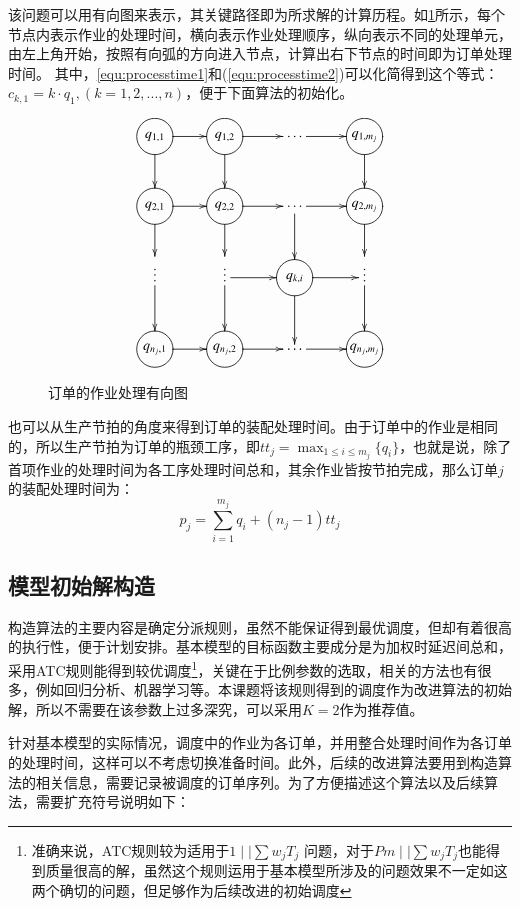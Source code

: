 该问题可以用有向图来表示，其关键路径即为所求解的计算历程。如\ref{fig:directedgraph}所示，每个节点内表示作业的处理时间，横向表示作业处理顺序，纵向表示不同的处理单元，由左上角开始，按照有向弧的方向进入节点，计算出右下节点的时间即为订单处理时间。
其中，\eqref{equ:processtime1}和(\ref{equ:processtime2})可以化简得到这个等式：$c_{k,1} = k\cdot q_1,(k = 1,2,...,n)$，便于下面算法的初始化。
\begin{figure}[h]
\begin{equation*}
\xymatrix{
\process{q_{1,1}} \ar[r] \ar[d] & \process{q_{1,2}} \ar[d] \ar[r] & \cdots\ar[r] & \process{q_{1,m_j}} \ar[d]\\
\process{q_{2,1}} \ar[r]\ar[d] & \process{q_{2,2}} \ar[d]\ar[r] & \cdots \ar[r] \ar[d]& \process{q_{2,m_j}} \ar[d] \\
\vdots\ar[d] & \vdots \ar[d]\ar[r] & \process{q_{k,i}}\ar[r]\ar[d] &\vdots \ar[d]\\
\process{q_{n_j,1}} \ar[r] & \process{q_{n_j,2}} \ar[r] & \cdots\ar[r] & \process{q_{n_j,m_j}}
}
\end{equation*}
\caption{订单的作业处理有向图\label{fig:directedgraph}}
\end{figure}

也可以从生产节拍的角度来得到订单的装配处理时间。由于订单中的作业是相同的，所以生产节拍为订单的瓶颈工序，即$\displaystyle tt_j = \max_{1\le i\le m_j}\{q_i\}$，也就是说，除了首项作业的处理时间为各工序处理时间总和，其余作业皆按节拍完成，那么订单$j$的装配处理时间为：
\begin{equation}
p_j = \sum_{i = 1}^{m_j}q_i + (n_j - 1)tt_j
\label{equ:processtime}
\end{equation}

\subsection{模型初始解构造}
构造算法的主要内容是确定分派规则，虽然不能保证得到最优调度，但却有着很高的执行性，便于计划安排。基本模型的目标函数主要成分是为加权时延迟间总和，采用ATC规则能得到较优调度\footnote{准确来说，ATC规则较为适用于$1\mid\mid \sum w_jT_j$ 问题，对于$Pm\mid\mid \sum w_jT_j$也能得到质量很高的解，虽然这个规则运用于基本模型所涉及的问题效果不一定如这两个确切的问题，但足够作为后续改进的初始调度}，关键在于比例参数的选取，相关的方法也有很多，例如回归分析、机器学习等。本课题将该规则得到的调度作为改进算法的初始解，所以不需要在该参数上过多深究，可以采用$K = 2$作为推荐值\cite{bilge2007tabu}。

针对基本模型的实际情况，调度中的作业为各订单，并用整合处理时间作为各订单的处理时间，这样可以不考虑切换准备时间。此外，后续的改进算法要用到构造算法的相关信息，需要记录被调度的订单序列。为了方便描述这个算法以及后续算法，需要扩充符号说明如下：

